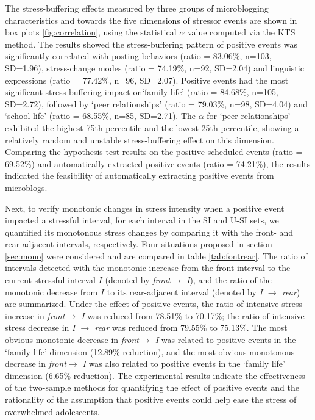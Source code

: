 \documentclass[5p,times,numbers,authoryear]{elsarticle}
\begin{document}
The stress-buffering effects measured by three groups of microblogging characteristics and towards the five dimensions of stressor events are shown in box plots \ref{fig:correlation},
using the statistical $\alpha$ value computed via the KTS method.
The results showed the stress-buffering pattern of positive events
was significantly correlated with posting behaviors (ratio = 83.06\%, n=103, SD=1.96),
stress-change modes (ratio = 74.19\%, n=92, SD=2.04) and linguistic expressions (ratio = 77.42\%, n=96, SD=2.07).
Positive events had the most significant stress-buffering impact on`family life' (ratio = 84.68\%, n=105, SD=2.72),
followed by `peer relationships' (ratio = 79.03\%, n=98, SD=4.04) and `school life' (ratio = 68.55\%, n=85, SD=2.71).
The $\alpha$ for `peer relationships'
exhibited the highest 75th percentile and the lowest 25th percentile,
showing a relatively random and unstable stress-buffering effect on this dimension.
Comparing the hypothesis test results on the positive scheduled events (ratio = 69.52\%)
and automatically extracted positive events (ratio = 74.21\%),
the results indicated the feasibility of automatically extracting positive events from microblogs.

Next, to verify monotonic changes in stress intensity when a positive event impacted a stressful interval, for each interval in the SI and U-SI sets, 
we quantified its monotonous stress changes by comparing it with the front- and rear-adjacent intervals, respectively.
Four situations proposed in section \ref{sec:mono} were considered and are compared in table \ref{tab:fontrear}.
The ratio of intervals detected with the monotonic increase from the front interval to the current stressful interval $I$ (denoted by \emph{front$ \rightarrow$ I}),
and the ratio of the monotonic decrease from $I$ to its rear-adjacent interval (denoted by \emph{I $\rightarrow$ rear}) are summarized.
Under the effect of positive events, 
the ratio of intensive stress increase in \emph{front$ \rightarrow$ I} was reduced from 78.51\% to 70.17\%;
the ratio of intensive stress decrease in \emph{I $\rightarrow$ rear} was reduced from 79.55\% to 75.13\%.
The most obvious monotonic decrease in \emph{front$ \rightarrow$ I} was related to positive events in the `family life' dimension (12.89\% reduction),
and the most obvious monotonous decrease in \emph{front$ \rightarrow$ I} was also related to positive events in the `family life' dimension (6.65\% reduction).
The experimental results indicate the effectiveness of the two-sample methods for quantifying the effect of positive events and the rationality of the assumption that positive events could help ease the stress of overwhelmed adolescents.
\end{document}
